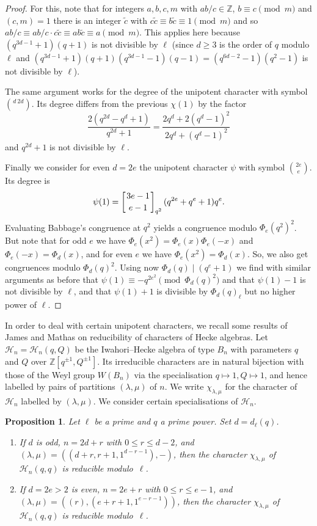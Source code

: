 \documentclass{ert-l}
\newcommand{\ZZ}{{\mathbb{Z}}}
\newcommand{\cH}{{\mathcal{H}}}
\let\la=\lambda
\newtheorem{prop}[thm]{Proposition}
\theoremstyle{definition}
\theoremstyle{remark}
\begin{document}
\begin{proof}
For this, note that for integers $a,b,c,m$ with $a b/c \in \ZZ$, $b \equiv c
\pmod{m}$ and $(c,m) = 1$ there is an integer $\tilde{c}$ with $c\tilde{c}
\equiv b \tilde{c}
\equiv 1 \pmod{m}$ and so $a b/c \equiv ab/c\cdot c\tilde{c} \equiv a b
\tilde{c} \equiv a \pmod{m}$. This applies here because $(q^{3d-1}+1)(q+1)$
is not divisible by $\ell$ (since $d\geq 3$ is the order of $q$ modulo
$\ell$ and $(q^{3d-1}+1)(q+1) (q^{3d-1}-1)(q-1) = (q^{6d-2}-1)(q^2-1)$ is
not divisible by $\ell$).

The same argument works for the degree of the unipotent character with symbol
$\binom{d\ 2d}{}$. Its degree differs from the previous $\chi(1)$ by the factor
\[\frac{2(q^{2d}-q^d+1)}{q^{2d}+1}
  = \frac{2q^d +2(q^d-1)^2}{2q^d+(q^d-1)^2}\]
and $q^{2d}+1$ is not divisible by $\ell$.

Finally we consider for even $d=2e$ the unipotent character $\psi$ with symbol
$\binom{2e}{e}$.   Its degree is
\[ \psi(1) = \left[3e-1\atop e-1\right]_{q^2} (q^{2e}+q^e+1)q^e.\]
Evaluating Babbage's congruence at $q^2$ yields a congruence modulo
$\Phi_e(q^2)^2$. But note that for odd $e$ we have $\Phi_e(x^2) = \Phi_e(x)
\Phi_e(-x)$ and $\Phi_e(-x) = \Phi_d(x)$, and for even $e$ we have
$\Phi_e(x^2) = \Phi_d(x)$. So, we also get congruences modulo $\Phi_d(q)^2$.
Using now  $\Phi_d(q) \mid (q^e+1)$ we find with similar arguments as
before that $\psi(1) \equiv -q^{2e^2} \pmod{\Phi_d(q)^2}$ and that
$\psi(1)-1$ is not divisible by $\ell$, and that $\psi(1)+1$ is divisible by
$\Phi_d(q)_\ell$ but no higher power of $\ell$.
\end{proof}

In order to deal with certain unipotent characters, we recall some
results of James and Mathas \cite{JM00} on reducibility of characters of Hecke
algebras. Let $\cH_n=\cH_n(q,Q)$ be the Iwahori--Hecke algebra of type $B_n$
with parameters $q$ and $Q$ over $\ZZ[q^{\pm1},Q^{\pm1}]$. Its irreducible
characters are in natural bijection with those of the Weyl group $W(B_n)$ via
the specialisation $q\mapsto1,Q\mapsto1$, and hence labelled by
pairs of partitions
$(\la,\mu)$ of $n$. We write $\chi_{\la,\mu}$ for the character of $\cH_n$
labelled by $(\la,\mu)$. We consider certain specialisations of $\cH_n$.

\begin{prop}   \label{prop:HeckeB}
 Let $\ell$ be a prime and $q$ a prime power. Set $d=d_\ell(q)$.
 \begin{enumerate}
  \item[\rm(a)] If $d$ is odd, $n=2d+r$ with $0\le r\le d-2$, and
   $(\la,\mu)=((d+r,r+1,1^{d-r-1}),-)$, then the character $\chi_{\la,\mu}$
   of $\cH_n(q,q)$ is reducible modulo~$\ell$.
  \item[\rm(b)] If $d=2e>2$ is even, $n=2e+r$ with $0\le r\le e-1$, and
   $(\la,\mu)=((r),(e+r+1,1^{e-r-1}))$, then the character $\chi_{\la,\mu}$
   of $\cH_n(q,q)$ is reducible modulo~$\ell$.
 \end{enumerate}
\end{prop}
\end{document}
